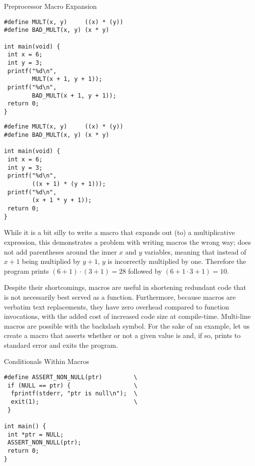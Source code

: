 \begin{clrr}[main.c]{Preprocessor Macro Expansion}
\begin{lstlisting}[language=MyC]
#define MULT(x, y)     ((x) * (y))
#define BAD_MULT(x, y) (x * y)

int main(void) {
 int x = 6;
 int y = 3;
 printf("%d\n", 
        MULT(x + 1, y + 1));
 printf("%d\n", 
        BAD_MULT(x + 1, y + 1));
 return 0;
}
\end{lstlisting}
\tcblower
\begin{lstlisting}[language=MyC]
#define MULT(x, y)     ((x) * (y))
#define BAD_MULT(x, y) (x * y)

int main(void) {
 int x = 6;
 int y = 3;
 printf("%d\n", 
        ((x + 1) * (y + 1)));
 printf("%d\n", 
        (x + 1 * y + 1));
 return 0;
}
\end{lstlisting}
\end{clrr}

While it is a bit silly to write a macro that expands out (to) a multiplicative expression, this demonstrates a problem with writing macros the wrong way;  does not add parentheses around the inner $x$ and $y$ variables, meaning that instead of $x+1$ being multiplied by $y+1$, $y$ is incorrectly multiplied by one. Therefore the program prints $(6+1)\cdot(3+1)=28$ followed by $(6+1\cdot{3}+1)=10$. 

Despite their shortcomings, macros are useful in shortening redundant code that is not necessarily best served as a function. Furthermore, because macros are verbatim text replacements, they have zero overhead compared to function invocations, with the added cost of increased code size at compile-time. Multi-line macros are possible with the backslash \ttt{\textbackslash{}} symbol. For the sake of an example, let us create a macro that asserts whether or not a given value is  and, if so, prints to standard error and exits the program.

\begin{cl}[main.c]{Conditionals Within Macros}
\begin{lstlisting}[language=MyC]
#define ASSERT_NON_NULL(ptr)         \
 if (NULL == ptr) {                  \
  fprintf(stderr, "ptr is null\n");  \
  exit(1);                           \
 }

int main() {
 int *ptr = NULL;
 ASSERT_NON_NULL(ptr);
 return 0;
}
\end{lstlisting}
\end{cl}

